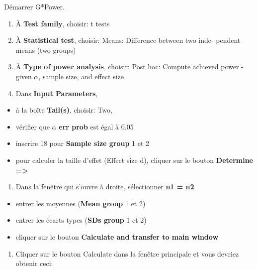 \documentclass[12pt,]{book}
\providecommand{\tightlist}{%
  \setlength{\itemsep}{0pt}\setlength{\parskip}{0pt}}
\begin{document}
Démarrer G*Power.

\begin{enumerate}
\def\labelenumi{\arabic{enumi}.}
\tightlist
\item
  À \textbf{Test family}, choisir: t tests
\item
  À \textbf{Statistical test}, choisir: Means: Difference between two inde- pendent means (two groups)
\item
  À \textbf{Type of power analysis}, choisir: Post hoc: Compute achieved power - given \(\alpha\), sample size, and effect size
\item
  Dans \textbf{Input Parameters},
\end{enumerate}

\begin{itemize}
\tightlist
\item
  à la boîte \textbf{Tail(s)}, choisir: Two,
\item
  vérifier que \(\alpha\) \textbf{err prob} est égal à 0.05
\item
  inscrire 18 pour \textbf{Sample size group} 1 et 2
\item
  pour calculer la taille d'effet (Effect size d), cliquer sur le bouton \textbf{Determine =\textgreater{}}
\end{itemize}

\begin{enumerate}
\def\labelenumi{\arabic{enumi}.}
\setcounter{enumi}{4}
\tightlist
\item
  Dans la fenêtre qui s'ouvre à droite, sélectionner \textbf{n1 = n2}
\end{enumerate}

\begin{itemize}
\tightlist
\item
  entrer les moyennes (\textbf{Mean group} 1 et 2)
\item
  entrer les écarts types (\textbf{SDs group} 1 et 2)
\item
  cliquer sur le bouton \textbf{Calculate and transfer to main window}
\end{itemize}

\begin{enumerate}
\def\labelenumi{\arabic{enumi}.}
\setcounter{enumi}{5}
\tightlist
\item
  Cliquer sur le bouton Calculate dans la fenêtre principale et vous devriez obtenir ceci:
\end{enumerate}
\end{document}
